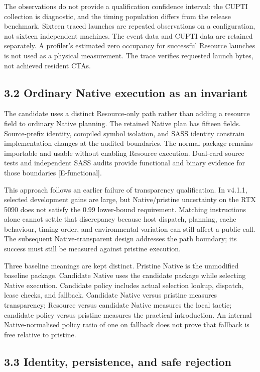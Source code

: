 \documentclass[11pt,a4paper]{article}
\begin{document}
The observations do not provide a qualification confidence interval: the CUPTI collection is diagnostic, and the timing population differs from the release benchmark. Sixteen traced launches are repeated observations on a configuration, not sixteen independent machines. The event data and CUPTI data are retained separately. A profiler's estimated zero occupancy for successful Resource launches is not used as a physical measurement. The trace verifies requested launch bytes, not achieved resident CTAs.


\subsection*{3.2 Ordinary Native execution as an invariant}

The candidate uses a distinct Resource-only path rather than adding a resource field to ordinary Native planning. The retained Native plan has fifteen fields. Source-prefix identity, compiled symbol isolation, and SASS identity constrain implementation changes at the audited boundaries. The normal package remains importable and usable without enabling Resource execution. Dual-card source tests and independent SASS audits provide functional and binary evidence for those boundaries [E-functional].


This approach follows an earlier failure of transparency qualification. In v4.1.1, selected development gains are large, but Native/\allowbreak{}pristine uncertainty on the RTX 5090 does not satisfy the 0.99 lower-bound requirement. Matching instructions alone cannot settle that discrepancy because host dispatch, planning, cache behaviour, timing order, and environmental variation can still affect a public call. The subsequent Native-transparent design addresses the path boundary; its success must still be measured against pristine execution.


Three baseline meanings are kept distinct. Pristine Native is the unmodified baseline package. Candidate Native uses the candidate package while selecting Native execution. Candidate policy includes actual selection lookup, dispatch, lease checks, and fallback. Candidate Native versus pristine measures transparency; Resource versus candidate Native measures the local tactic; candidate policy versus pristine measures the practical introduction. An internal Native-normalised policy ratio of one on fallback does not prove that fallback is free relative to pristine.


\subsection*{3.3 Identity, persistence, and safe rejection}
\end{document}
